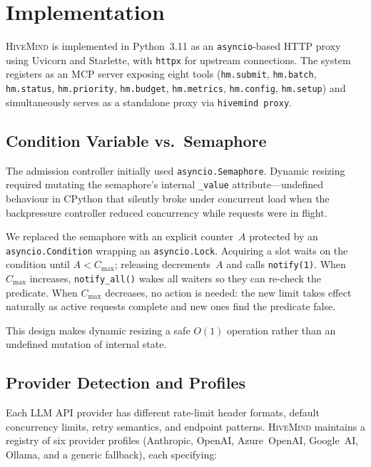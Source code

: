 \documentclass[11pt,twocolumn]{article}
\newcommand{\tool}[1]{\texttt{#1}}
\newcommand{\hm}{\textsc{HiveMind}}
\begin{document}
\section{Implementation}
\label{sec:implementation}

\hm{} is implemented in Python~3.11 as an \texttt{asyncio}-based
HTTP proxy using Uvicorn and Starlette, with \texttt{httpx} for
upstream connections.  The system registers as an MCP server
exposing eight tools (\tool{hm.submit}, \tool{hm.batch},
\tool{hm.status}, \tool{hm.priority}, \tool{hm.budget},
\tool{hm.metrics}, \tool{hm.config}, \tool{hm.setup}) and
simultaneously serves as a standalone proxy via
\texttt{hivemind~proxy}.

\subsection{Condition Variable vs.\ Semaphore}
\label{sec:condvar}

The admission controller initially used
\texttt{asyncio.Semaphore}.  Dynamic resizing required mutating
the semaphore's internal \texttt{\_value} attribute---undefined
behaviour in CPython that silently broke under concurrent load
when the backpressure controller reduced concurrency while
requests were in flight.

We replaced the semaphore with an explicit counter~$A$ protected
by an \texttt{asyncio.Condition} wrapping an
\texttt{asyncio.Lock}.  Acquiring a slot waits on the condition
until $A < C_{\max}$; releasing decrements~$A$ and calls
\texttt{notify(1)}.  When $C_{\max}$ increases,
\texttt{notify\_all()} wakes all waiters so they can re-check
the predicate.  When $C_{\max}$ decreases, no action is needed:
the new limit takes effect naturally as active requests complete
and new ones find the predicate false.

This design makes dynamic resizing a safe $O(1)$ operation
rather than an undefined mutation of internal state.

\subsection{Provider Detection and Profiles}
\label{sec:providers}

Each LLM API provider has different rate-limit header formats,
default concurrency limits, retry semantics, and endpoint
patterns.  \hm{} maintains a registry of six provider profiles
(Anthropic, OpenAI, Azure~OpenAI, Google~AI, Ollama, and a
generic fallback), each specifying:
\end{document}
